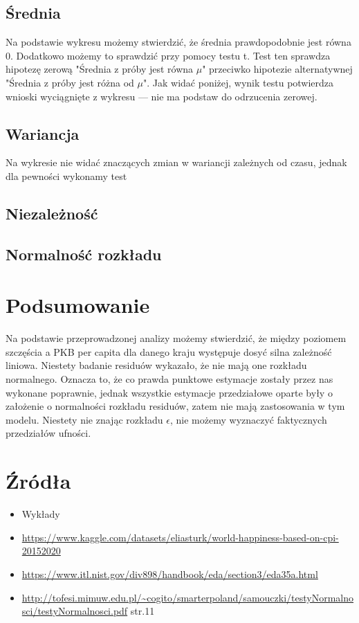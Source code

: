 \documentclass{article}
\theoremstyle{break}
\begin{document}
\subsection{Średnia}
Na podstawie wykresu możemy stwierdzić, że średnia prawdopodobnie jest równa 0. Dodatkowo możemy to sprawdzić przy pomocy testu t. Test ten sprawdza hipotezę zerową "Średnia z próby jest równa $\mu$" przeciwko hipotezie alternatywnej "Średnia z próby jest różna od $\mu$". Jak widać poniżej, wynik testu potwierdza wnioski wyciągnięte z wykresu — nie ma podstaw do odrzucenia zerowej.

\subsection{Wariancja}
Na wykresie nie widać znaczących zmian w wariancji zależnych od czasu, jednak dla pewności wykonamy test 

\subsection{Niezależność}

\subsection{Normalność rozkładu}



	\section{Podsumowanie}
	
	Na podstawie przeprowadzonej analizy możemy stwierdzić, że między poziomem szczęścia a PKB per capita dla danego kraju występuje dosyć silna zależność liniowa. Niestety badanie residuów wykazało, że nie mają one rozkładu normalnego. Oznacza to, że co prawda punktowe estymacje zostały przez nas wykonane poprawnie, jednak wszystkie estymacje przedziałowe oparte były o założenie o normalności rozkładu residuów, zatem nie mają zastosowania w tym modelu. Niestety nie znając rozkładu $\epsilon$, nie możemy wyznaczyć faktycznych przedziałów ufności.
	
	\section{Źródła}
	\begin{itemize}
		\item Wykłady
		\item \url{https://www.kaggle.com/datasets/eliasturk/world-happiness-based-on-cpi-20152020}
		\item \url{https://www.itl.nist.gov/div898/handbook/eda/section3/eda35a.html}
		\item \url{http://tofesi.mimuw.edu.pl/~cogito/smarterpoland/samouczki/testyNormalnosci/testyNormalnosci.pdf} str.11
		
	\end{itemize}
	
	
\end{document}
